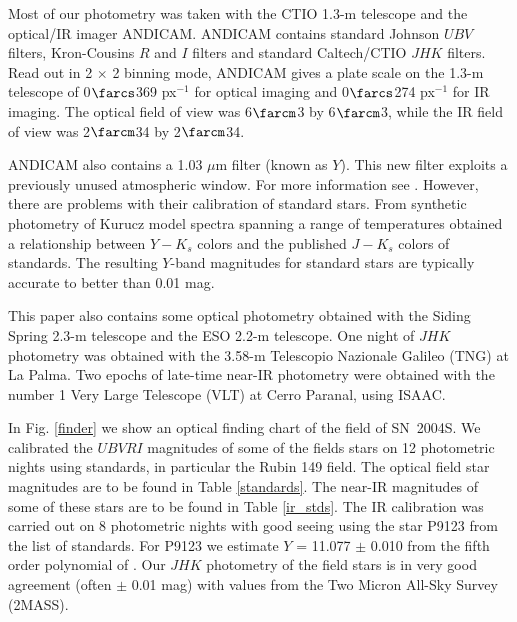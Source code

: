 \documentclass[12pt,preprint,psfig,epsf]{aastex}
\newcommand{\ubvri}{\protect\hbox{$U\!BV\!RI$} }
\begin{document}
Most of our photometry was taken with the CTIO 1.3-m telescope and the
optical/IR imager ANDICAM. ANDICAM contains standard Johnson $UBV$ filters,
Kron-Cousins $R$ and $I$ filters and standard Caltech/CTIO $JHK$ filters.  
Read out in 2 $\times$ 2 binning mode, ANDICAM gives a plate scale on the
1.3-m telescope of 0$\farcs$369 px$^{-1}$ for 
optical imaging and 0$\farcs$274 px$^{-1}$ for IR imaging.
The optical field of view was 6$\farcm$3 by 6$\farcm$3, 
while the IR field of view was 2$\farcm$34 by 2$\farcm$34.

ANDICAM also contains a 1.03 $\mu$m filter (known as $Y$).  This new
filter exploits a previously unused atmospheric window.  For more
information see \citet{Hil_etal03}.  However, there are problems with
their calibration of standard stars.  From synthetic photometry of
Kurucz model spectra spanning a range of temperatures \citet[][Appendix
C]{Ham_etal06} obtained a relationship between $Y-K_s$ colors and the
published $J-K_s$ colors of \citet{Per_etal98} standards. The resulting
$Y$-band magnitudes for standard stars are typically accurate to better
than 0.01 mag.


This paper also contains some optical photometry obtained with the Siding
Spring 2.3-m telescope and the ESO 2.2-m telescope.  One night of $JHK$
photometry was obtained with the 3.58-m Telescopio Nazionale Galileo (TNG)
at La Palma.  Two epochs of late-time near-IR photometry were obtained with
the number 1 Very Large Telescope (VLT) at Cerro Paranal, using ISAAC.

In Fig. \ref{finder} we show an optical finding chart of the field of
SN~2004S.  We calibrated the \ubvri magnitudes of some of the fields stars
on 12 photometric nights using \citet{Lan92} standards, in particular the
Rubin 149 field.  The optical field star magnitudes are to be found in Table
\ref{standards}. The near-IR magnitudes of some of these stars are to be
found in Table \ref{ir_stds}.  The IR calibration was carried out on 8
photometric nights with good seeing using the star P9123 from the list of
\citet{Per_etal98} standards.  For P9123 we estimate $Y$ = 11.077 $\pm$
0.010 from the fifth order polynomial of \citet{Ham_etal06}.
Our $JHK$ photometry of the field stars is in very good agreement (often $\pm$ 0.01 
mag) with values from the Two Micron All-Sky Survey (2MASS).
\end{document}
